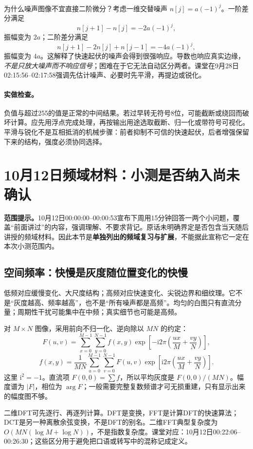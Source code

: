 为什么噪声图像不宜直接二阶微分？考虑一维交替噪声 $n[j]=a(-1)^j$。一阶差分满足
\[
n[j+1]-n[j]=-2a(-1)^j,
\]
振幅变为 $2a$；二阶差分满足
\[
n[j+1]-2n[j]+n[j-1]=-4a(-1)^j,
\]
振幅变为 $4a$。这解释了快速起伏的噪声会得到很强响应。导数也响应真实边缘，\emph{不是只放大噪声而不响应信号}；困难在于它无法自动区分两者。课堂在9月28日02:15:56--02:17:58强调先估计噪声、必要时先平滑，再提边或锐化。

\paragraph{实做检查。}负值与超过255的值是正常的中间结果。若过早转无符号8位，可能截断或绕回而破坏计算。应先用浮点完成处理，再按输出用途选取截断、归一化或带符号可视化。平滑与锐化不是互相抵消的机械步骤：前者抑制不可信的快速起伏，后者增强保留下来的结构，强度必须协同选择。

\section{10月12日频域材料：小测是否纳入尚未确认}
\noindent\textbf{范围提示。}10月12日00:00:00--00:00:53宣布下周用15分钟回答一两个小问题，覆盖“前面讲过”的内容，强调理解、不要求背记。原话未明确界定是否包含当天随后讲授的频域材料。因此本节是\textbf{单独列出的频域复习与扩展}，不能据此宣称它一定在本次小测范围内。

\subsection{空间频率：快慢是灰度随位置变化的快慢}
低频对应缓慢变化、大尺度结构；高频对应快速变化、尖锐边界和细纹理。它不是“灰度越高、频率越高”，也不是“所有噪声都是高频”。均匀的白图只有直流分量；周期性干扰可能集中在中频；真实细节也可能是高频。

对 $M\times N$ 图像，采用前向不归一化、逆向除以 $MN$ 的约定：
\[
F(u,v)=\sum_{x=0}^{M-1}\sum_{y=0}^{N-1} f(x,y)
\exp\left[-\mathrm i2\pi\left(\frac{ux}{M}+\frac{vy}{N}\right)\right],
\]
\[
f(x,y)=\frac1{MN}\sum_{u=0}^{M-1}\sum_{v=0}^{N-1} F(u,v)
\exp\left[\mathrm i2\pi\left(\frac{ux}{M}+\frac{vy}{N}\right)\right].
\]
这里 $\mathrm i^2=-1$。直流项 $F(0,0)=\sum f$，所以平均灰度是 $F(0,0)/(MN)$。幅度谱为 $|F|$，相位为 $\arg F$；一般需要完整复数频谱才可无损重建，只有显示出来的幅度图不够。

二维DFT可先逐行、再逐列计算。DFT是变换，FFT是计算DFT的快速算法；DCT是另一种离散余弦变换，不是DFT的别名。二维FFT典型复杂度为 $O(MN(\log M+\log N))$，不是指数复杂度。课堂对应：10月12日00:22:06--00:26:30；这些区分用于避免把口语或转写中的混称记成定义。

